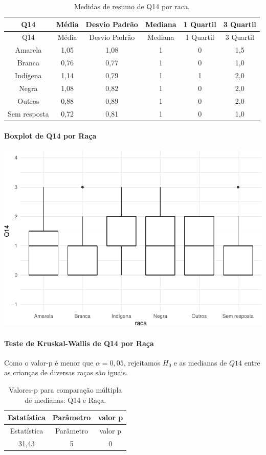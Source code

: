\documentclass[]{article}
\let\oldparagraph\paragraph
\renewcommand{\paragraph}[1]{\oldparagraph{#1}\mbox{}}
\begin{document}
\begin{longtable}[]{@{}cccccc@{}}
\caption{\label{tab:unnamed-chunk-84}Medidas de resumo de Q14 por raca.}\tabularnewline
\toprule
Q14 & Média & Desvio Padrão & Mediana & 1 Quartil & 3 Quartil\tabularnewline
\midrule
\endfirsthead
\toprule
Q14 & Média & Desvio Padrão & Mediana & 1 Quartil & 3 Quartil\tabularnewline
\midrule
\endhead
Amarela & 1,05 & 1,08 & 1 & 0 & 1,5\tabularnewline
Branca & 0,76 & 0,77 & 1 & 0 & 1,0\tabularnewline
Indígena & 1,14 & 0,79 & 1 & 1 & 2,0\tabularnewline
Negra & 1,08 & 0,82 & 1 & 0 & 2,0\tabularnewline
Outros & 0,88 & 0,89 & 1 & 0 & 2,0\tabularnewline
Sem resposta & 0,72 & 0,81 & 1 & 0 & 1,0\tabularnewline
\bottomrule
\end{longtable}

\hypertarget{boxplot-de-q14-por-rauxe7a}{%
\paragraph{Boxplot de Q14 por Raça}\label{boxplot-de-q14-por-rauxe7a}}

\begin{center}\includegraphics[width=0.75\linewidth]{relatorio_files/figure-latex/unnamed-chunk-85-1} \end{center}

\hypertarget{teste-de-kruskal-wallis-de-q14-por-rauxe7a}{%
\paragraph{Teste de Kruskal-Wallis de Q14 por Raça}\label{teste-de-kruskal-wallis-de-q14-por-rauxe7a}}

Como o valor-p é menor que \(\alpha=0,05\), rejeitamos \(H_0\) e as medianas de \(Q14\) entre as crianças de diversas raças são iguais.

\begin{longtable}[]{@{}ccc@{}}
\caption{\label{tab:unnamed-chunk-86}Valores-p para comparação múltipla de medianas: Q14 e Raça.}\tabularnewline
\toprule
Estatística & Parâmetro & valor p\tabularnewline
\midrule
\endfirsthead
\toprule
Estatística & Parâmetro & valor p\tabularnewline
\midrule
\endhead
31,43 & 5 & 0\tabularnewline
\bottomrule
\end{longtable}
\end{document}

